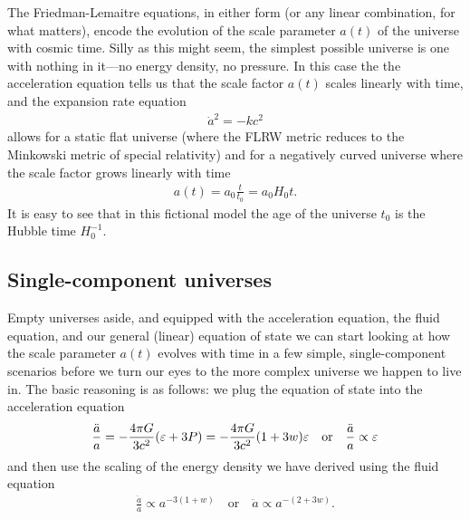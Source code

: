The Friedman-Lemaitre equations, in either form (or any linear combination, for
what matters), encode the evolution of the scale parameter $a(t)$ of the universe
with cosmic time. Silly as this might seem, the simplest possible universe is one
with nothing in it---no energy density, no pressure. In this case the the acceleration
equation tells us that the scale factor $a(t)$ scales linearly with time, and the
expansion rate equation
\begin{align*}
  \dot{a}^2 = - k c^2
\end{align*}
allows for a static flat universe (where the FLRW metric reduces to the Minkowski
metric of special relativity) and for a negatively curved universe where
the scale factor grows linearly with time
\begin{align}
  a(t) = a_0 \frac{t}{t_0} = a_0 H_0 t.
\end{align}
It is easy to see that in this fictional model the age of the universe $t_0$ is the
Hubble time $H_0^{-1}$.



\subsection{Single-component universes}

Empty universes aside, and equipped with the acceleration equation, the fluid equation,
and our general (linear) equation of state we can start looking at how the scale parameter
$a(t)$ evolves with time in a few simple, single-component scenarios before we turn our eyes to the more complex
universe we happen to live in. The basic reasoning is as follows: we plug the equation
of state into the acceleration equation
\begin{align*}
  \frac{\ddot{a}}{a} =
  -\frac{4\pi G}{3c^2}(\varepsilon + 3P) =
  -\frac{4\pi G}{3c^2} (1 + 3w) \varepsilon
  \quad\text{or}\quad
  \frac{\ddot{a}}{a} \propto \varepsilon
\end{align*}
and then use the scaling of the energy density we have derived using the fluid
equation
\begin{align*}
  \frac{\ddot{a}}{a} \propto a^{-3(1 + w)}
  \quad \text{or} \quad \ddot{a} \propto a^{-(2 + 3w)}.
\end{align*}


